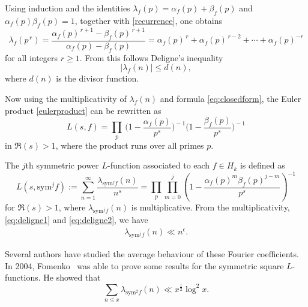 \documentclass[10pt]{amsart}
\begin{document}
Using induction and the identities \( \lambda_f(p)=\alpha_f(p)+\beta_f(p) \) and \( \alpha_f(p)\beta_f(p)=1 \), together with \eqref{recurrence}, one obtains
\begin{equation}\label{eq:closedform}
\lambda_f(p^{\,r}) 
= \frac{\alpha_f(p)^{\,r+1}-\beta_f(p)^{\,r+1}}{\alpha_f(p)-\beta_f(p)}
= \alpha_f(p)^{\,r}+\alpha_f(p)^{\,r-2}+\cdots+\alpha_f(p)^{-r}
\end{equation}
for all integers \( r\ge 1 \). From this follows Deligne's inequality
\begin{equation}\label{Deligne bound}
|\lambda_{f}(n)|\leq d(n),    
\end{equation}
where \( d(n) \) is the divisor function.

Now using the multiplicativity of \( \lambda_{f}(n) \) and formula \eqref{eq:closedform}, the Euler product \eqref{eulerproduct} can be rewritten as
\begin{equation}\label{Lfactorization}
L(s,f)=\prod_{p}\,
\biggl(1-\frac{\alpha_{f}(p)}{p^{s}}\biggr)^{\!-1}
\biggl(1-\frac{\beta_{f}(p)}{p^{s}}\biggr)^{\!-1}
\end{equation}
in \(\Re(s)>1\), where the product runs over all primes \( p \).

The $j$th symmetric power $L$-function associated to each $f\in H_k $ is defined as
\[
L(s,\mathrm{sym}^{j}f):=\sum_{n=1}^{\infty}\frac{\lambda_{\mathrm{sym}^{j}f}(n)}{n^{s}}=\prod_{p}\prod_{m=0}^{j}\left(1-\frac{\alpha_f(p)^{m}\beta_f(p)^{j-m}}{p^s}\right)^{-1}
\]
for $\Re(s)>1$, where $\lambda_{\mathrm{sym}^{j}f}(n)$ is multiplicative. From the multiplicativity, \eqref{eq:deligne1} and \eqref{eq:deligne2}, we have \begin{align}
    \lambda_{\mathrm{sym}^jf}(n) \ll n^{\epsilon}.
\end{align}

Several authors have studied the average behaviour of these Fourier coefficients. In 2004, Fomenko~\cite{Fomenko2004} was able to prove some results for the symmetric square $L$-functions. He showed that
\[
\sum_{n\leq x}\lambda_{\mathrm{sym}^{2}f}(n)\ll x^{\frac{1}{2}}\log^{2}x.
\]


\end{document}
